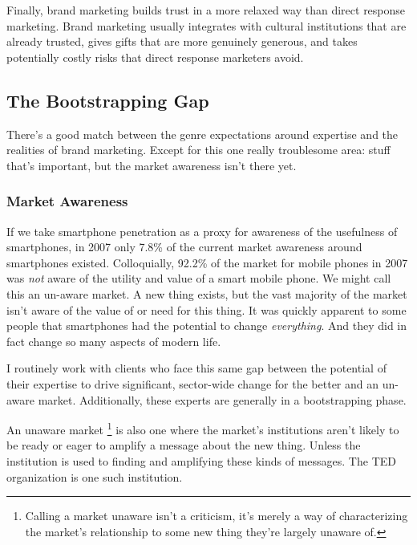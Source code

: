 \documentclass[13pt,]{tufte-handout}
\begin{document}
Finally, brand marketing builds trust in a more relaxed way than direct
response marketing. Brand marketing usually integrates with cultural
institutions that are already trusted, gives gifts that are more
genuinely generous, and takes potentially costly risks that direct
response marketers avoid.

\hypertarget{the-bootstrapping-gap}{%
\subsection{The Bootstrapping Gap}\label{the-bootstrapping-gap}}

There's a good match between the genre expectations around expertise and
the realities of brand marketing. Except for this one really troublesome
area: stuff that's important, but the market awareness isn't there yet.

\hypertarget{market-awareness}{%
\subsubsection{Market Awareness}\label{market-awareness}}

If we take smartphone penetration as a proxy for awareness of the
usefulness of smartphones, in 2007 only 7.8\% of the current market
awareness around smartphones existed. Colloquially, 92.2\% of the market
for mobile phones in 2007 was \emph{not} aware of the utility and value
of a smart mobile phone. We might call this an un-aware market. A new
thing exists, but the vast majority of the market isn't aware of the
value of or need for this thing. It was quickly apparent to some people
that smartphones had the potential to change \emph{everything}. And they
did in fact change so many aspects of modern life.

I routinely work with clients who face this same gap between the
potential of their expertise to drive significant, sector-wide change
for the better and an un-aware market. Additionally, these experts are
generally in a bootstrapping phase.

An unaware market \footnote{Calling a market unaware isn't a criticism,
  it's merely a way of characterizing the market's relationship to some
  new thing they're largely unaware of.} is also one where the market's
institutions aren't likely to be ready or eager to amplify a message
about the new thing. Unless the institution is used to finding and
amplifying these kinds of messages. The TED organization is one such
institution.
\end{document}
